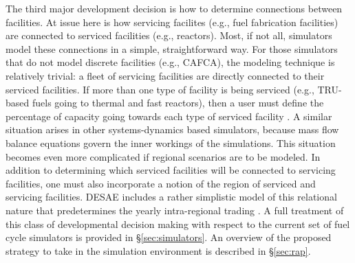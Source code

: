 The third major development decision is how to determine connections between
facilities. At issue here is how servicing facilites (e.g., fuel fabrication
facilities) are connected to serviced facilities (e.g., reactors). Most, if not
all, simulators model these connections in a simple, straightforward way. For
those simulators that do not model discrete facilities (e.g., CAFCA), the
modeling technique is relatively trivial: a fleet of servicing facilities are
directly connected to their serviced facilities. If more than one type of
facility is being serviced (e.g., TRU-based fuels going to thermal and fast
reactors), then a user must define the percentage of capacity going towards each
type of serviced facility \cite{busquim_e_silva_system_2008}. A similar
situation arises in other systems-dynamics based simulators, because mass flow
balance equations govern the inner workings of the simulations. This situation
becomes even more complicated if regional scenarios are to be modeled. In
addition to determining which serviced facilities will be connected to servicing
facilities, one must also incorporate a notion of the region of serviced and
servicing facilities. DESAE includes a rather simplistic model of this
relational nature that predetermines the yearly intra-regional trading
\cite{iaea_nuclear_2010}. A full treatment of this class of developmental
decision making with respect to the current set of fuel cycle simulators is
provided in \S\ref{sec:simulators}. An overview of the proposed strategy to
take in the \Cyclus simulation environment is described in \S\ref{sec:rap}.
